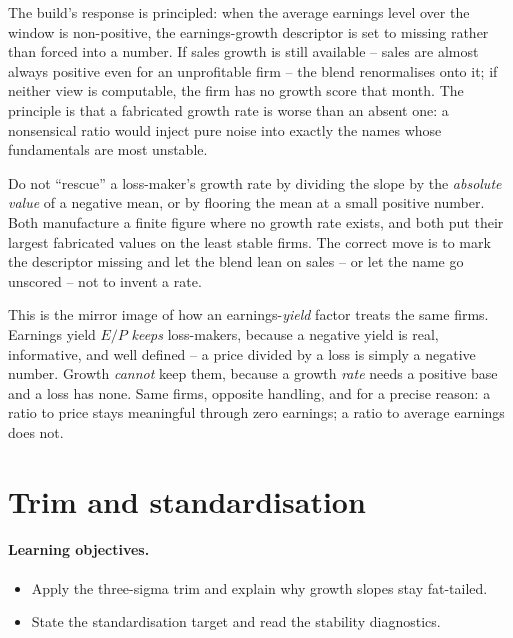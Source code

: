 \documentclass[11pt]{article}
\theoremstyle{definition}
\theoremstyle{plain}
\theoremstyle{remark}
\begin{document}
The build's response is principled: when the average earnings level over the window is non-positive, the earnings-growth descriptor is set to missing rather than forced into a number. If sales growth is still available -- sales are almost always positive even for an unprofitable firm -- the blend renormalises onto it; if neither view is computable, the firm has no growth score that month. The principle is that a fabricated growth rate is worse than an absent one: a nonsensical ratio would inject pure noise into exactly the names whose fundamentals are most unstable.

\begin{pitfall}
Do not ``rescue'' a loss-maker's growth rate by dividing the slope by the \emph{absolute value} of a negative mean, or by flooring the mean at a small positive number. Both manufacture a finite figure where no growth rate exists, and both put their largest fabricated values on the least stable firms. The correct move is to mark the descriptor missing and let the blend lean on sales -- or let the name go unscored -- not to invent a rate.
\end{pitfall}

\begin{intuition}
This is the mirror image of how an earnings-\emph{yield} factor treats the same firms. Earnings yield $E/P$ \emph{keeps} loss-makers, because a negative yield is real, informative, and well defined -- a price divided by a loss is simply a negative number. Growth \emph{cannot} keep them, because a growth \emph{rate} needs a positive base and a loss has none. Same firms, opposite handling, and for a precise reason: a ratio to price stays meaningful through zero earnings; a ratio to average earnings does not.
\end{intuition}

\section{Trim and standardisation}\label{sec:std}

\paragraph{Learning objectives.}
\begin{itemize}[leftmargin=1.4em,topsep=2pt]
  \item Apply the three-sigma trim and explain why growth slopes stay fat-tailed.
  \item State the standardisation target and read the stability diagnostics.
\end{itemize}
\end{document}
